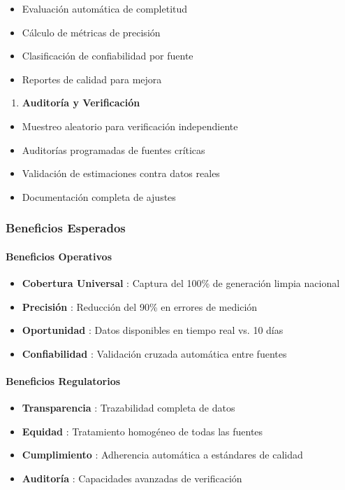 \documentclass{cel}
\begin{document}
\begin{itemize}
\item Evaluación automática de completitud
\item Cálculo de métricas de precisión
\item Clasificación de confiabilidad por fuente
\item Reportes de calidad para mejora
\end{itemize}
\begin{enumerate}
\item \textbf{Auditoría y Verificación}
\end{enumerate}
\begin{itemize}
\item Muestreo aleatorio para verificación independiente
\item Auditorías programadas de fuentes críticas
\item Validación de estimaciones contra datos reales
\item Documentación completa de ajustes

\end{itemize}
\subsubsection{Beneficios Esperados}
\nopagebreak

\paragraph{Beneficios Operativos}
\nopagebreak

\begin{itemize}
\item \textbf{Cobertura Universal} : Captura del 100\% de generación limpia nacional
\item \textbf{Precisión} : Reducción del 90\% en errores de medición
\item \textbf{Oportunidad} : Datos disponibles en tiempo real vs. 10 días
\item \textbf{Confiabilidad} : Validación cruzada automática entre fuentes

\end{itemize}
\paragraph{Beneficios Regulatorios}
\nopagebreak

\begin{itemize}
\item \textbf{Transparencia} : Trazabilidad completa de datos
\item \textbf{Equidad} : Tratamiento homogéneo de todas las fuentes
\item \textbf{Cumplimiento} : Adherencia automática a estándares de calidad
\item \textbf{Auditoría} : Capacidades avanzadas de verificación

\end{itemize}
\end{document}
